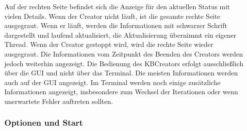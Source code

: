 \documentclass[12pt,a4paper]{article}
\begin{document}
Auf der rechten Seite befindet sich die Anzeige für den aktuellen Status mit vielen Details. Wenn der Creator nicht läuft, ist die gesamte rechte Seite ausgegraut. Wenn er läuft, werden die Informationen mit schwarzer Schrift dargestellt und laufend aktualisiert, die Aktualisierung übernimmt ein eigener Thread. Wenn der Creator gestoppt wird, wird die rechte Seite wieder ausgegraut. Die Informationen vom Zeitpunkt des Beenden des Creators werden jedoch weiterhin angezeigt. Die Bedienung des KBCreators erfolgt ausschließlich über die GUI und nicht über das Terminal. Die meisten Informationen werden auch auf der GUI angezeigt. Im Terminal werden noch einige zusätzliche Informationen angezeigt, insbesondere zum Wechsel der Iterationen oder wenn unerwartete Fehler auftreten sollten.


\subsubsection{Optionen und Start}
\end{document}
